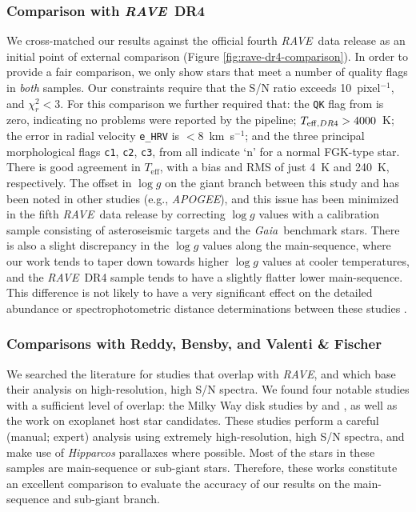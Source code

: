 \documentclass[preprint]{aastex61}
\newcommand{\acronym}[1]{{\small{#1}}}
\newcommand{\project}[1]{\textsl{#1}}
\newcommand{\gaia}{\project{Gaia}}
\newcommand{\rave}{\project{\acronym{RAVE}}}
\newcommand{\apogee}{\project{\acronym{APOGEE}}}
\newcommand{\teff}{T_{\mathrm{eff}}}
\newcommand{\logg}{\log g}
\begin{document}
\subsubsection{Comparison with \rave\ DR4}
\label{sec:validation-kordopatis}

We cross-matched our results against the official fourth \rave\ data release 
\citep{Kordopatis_2013}
as an initial point of external comparison (Figure \ref{fig:rave-dr4-comparison}).
In order to provide a fair comparison, we only show stars that meet a number
of quality flags in \emph{both} samples.  Our constraints require that the
S/N ratio exceeds 10~pixel$^{-1}$, and $\chi_r^2 < 3$.  For this comparison
we further required that:
the \texttt{QK} flag from \citet{Kordopatis_2013} is zero, indicating no
problems were reported by the pipeline; $T_{{\rm eff},DR4} > 4000$~K;
the error in radial velocity \texttt{e\_HRV} is $<$8~km~s$^{-1}$; and the three
principal morphological flags \texttt{c1}, \texttt{c2}, \texttt{c3}, from 
\citet{Matijevic_2012} all indicate `n' for a normal FGK-type star.
There is good agreement in $\teff$, with a bias and RMS of just 4~K and 240~K,
respectively. The offset in $\logg$ on the giant branch between this study and 
\citet{Kordopatis_2013} has been noted in other studies (e.g., \apogee), and this issue
has been minimized in the fifth \rave\ data release by correcting $\logg$
values with a calibration sample consisting of asteroseismic targets and the
\gaia\ benchmark stars.  There is also a
slight discrepancy in the $\logg$ values along the main-sequence, where our
work tends to taper down towards higher $\logg$ values at cooler temperatures,
and the \rave\ DR4 sample tends to have a slightly flatter lower main-sequence.
This difference is not likely to have a very significant effect on the detailed
abundance or spectrophotometric distance determinations between these studies 
\citep{Binney_2014}.


\subsubsection{Comparisons with Reddy, Bensby, and Valenti \& Fischer}
\label{sec:validation-gold-standards}


We searched the literature for studies that overlap with \rave, and which base
their analysis on high-resolution, high S/N spectra.  We found four notable
studies with a sufficient level of overlap: the Milky Way disk studies by 
\citet{Reddy_2003,Reddy_2006} and \citet{Bensby_2014}, as well as the 
\citet{Valenti_Fischer_2005} work on exoplanet host star candidates.  These 
studies perform a careful (manual; expert) analysis using extremely 
high-resolution, high S/N spectra, and make use of \project{Hipparcos} 
parallaxes where possible.  Most of the stars in these samples are 
main-sequence or sub-giant stars.  Therefore, these works constitute an 
excellent comparison to evaluate the accuracy of our results on the 
main-sequence and sub-giant branch.
\end{document}
